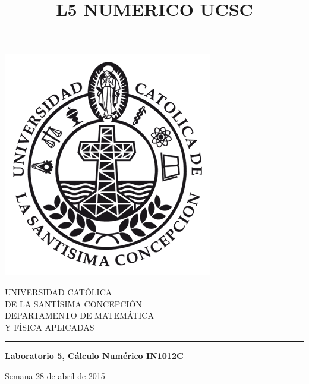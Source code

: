 \documentclass[11pt]{article}
\begin{document}
\title{L5 NUMERICO UCSC}

\begin{minipage}{0.15\textwidth}
\includegraphics[width=\textwidth]{ucsc.png}
\end{minipage}
\begin{minipage}{0.9\textwidth}
{UNIVERSIDAD CAT\'OLICA}\\ 
{DE LA SANT\'ISIMA CONCEPCI\'ON}\\
{DEPARTAMENTO DE MATEM\'ATICA}\\ 
{ Y F\'ISICA APLICADAS}\\
\rule{0.66\textwidth}{.5pt} %
\end{minipage}

\vspace*{0.5cm} \centerline {\bf\underline{Laboratorio 5, C\'alculo Num\'erico  IN1012C }}
\centerline{\textrm{Semana 28 de abril de 2015}}  \vspace{0.2cm}




\end{document}
